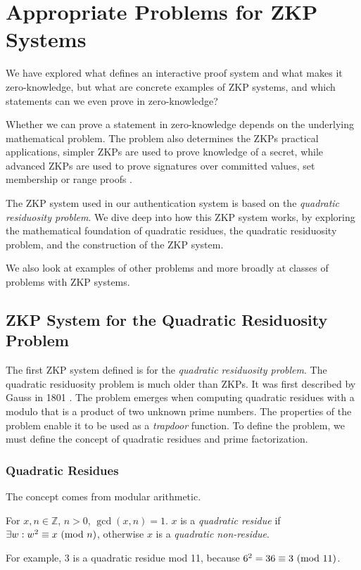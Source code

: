 \section{Appropriate Problems for ZKP Systems}
We have explored what defines an interactive proof system and what makes it zero-knowledge, but what are concrete examples of ZKP systems, and which statements can we even prove in zero-knowledge?

Whether we can prove a statement in zero-knowledge depends on the underlying mathematical problem.
The problem also determines the ZKPs practical applications, simpler ZKPs are used to prove knowledge of a secret, while advanced ZKPs are used to prove signatures over committed values, set membership or range proofs \cite{camenisch2008efficient, bunz2018bulletproofs, camenisch2001efficient, bowe2018multi}.

The ZKP system \cite{goldwasser1989knowledge} used in our authentication system is based on the \textit{quadratic residuosity problem}.
We dive deep into how this ZKP system works, by exploring the mathematical foundation of quadratic residues, the quadratic residuosity problem, and the construction of the ZKP system.

We also look at examples of other problems and more broadly at classes of problems with ZKP systems.

\subsection{ZKP System for the Quadratic Residuosity Problem}
\label{zkp-qrp}
The first ZKP system defined \cite{goldwasser1989knowledge} is for the \textit{quadratic residuosity problem}.
The quadratic residuosity problem is much older than ZKPs. It was first described by Gauss in 1801 \cite{10.2307/j.ctt1cc2mnd}.
The problem emerges when computing quadratic residues with a modulo that is a product of two unknown prime numbers.
The properties of the problem enable it to be used as a \textit{trapdoor} function.
To define the problem, we must define the concept of quadratic residues and prime factorization.

\subsubsection{Quadratic Residues} 
The concept \cite{andrews1994number} comes from modular arithmetic.

\begin{remark}
	For $x, n \in \mathbb{Z}$, $n > 0$, $\gcd(x, n) = 1 $.
	$x$ is a \textit{quadratic residue} if  $\exists w:w^2 \equiv x \ (\mathrm{mod}\ n)$, otherwise $x$ is a \textit{quadratic non-residue}.
\end{remark}
\noindent For example,
$3$ is a quadratic residue mod 11, because $6^2 = 36 \equiv 3 \ (\mathrm{mod}\ 11)$.

